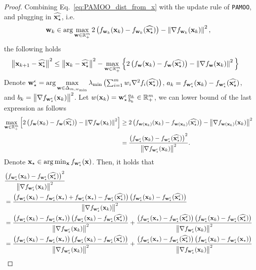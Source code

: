 \begin{proof}
Combining Eq.~\eqref{eq:PAMOO_dist_from_x} with the update rule of \texttt{PAMOO}, and plugging in $\widehat{{{\mathbf{x}}_\star^\epsilon}}$, i.e. 
$$
{\mathbf{w}}_k\in \arg\max_{{\mathbf{w}}\in \mathbb{R}^m_+} 2\left(f_{{\mathbf{w}}_k}({\mathbf{x}}_k)- f_{{\mathbf{w}}_k} (\widehat{{{\mathbf{x}}_\star^\epsilon}})\right) - \left\Vert\nabla f_{{\mathbf{w}}_k}({\mathbf{x}}_k)\right\Vert^2,
$$
the following holds
\begin{align}
    \left\Vert{\mathbf{x}}_{k+1}-\widehat{{{\mathbf{x}}_\star^\epsilon}}\right\Vert^2 &\leq \left\Vert{\mathbf{x}}_k-\widehat{{{\mathbf{x}}_\star^\epsilon}}\right\Vert^2 -  \max_{{\mathbf{w}} \in \mathbb{R}_+^m} \Big{\{} 2\left(f_{{\mathbf{w}}}({\mathbf{x}}_k)- f_{{\mathbf{w}}} (\widehat{{{\mathbf{x}}_\star^\epsilon}})\right) - \left\Vert\nabla f_{{\mathbf{w}}}({\mathbf{x}}_k)\right\Vert^2 \Big{\}} \label{eq:epsilon_PAMOO_dist_from_opt}
\end{align}
Denote ${{\mathbf{w}}_\star^\epsilon} = \arg\max\limits_{{\mathbf{w}}\in \Delta_{m,{w_{\min}}}} \lambda_{\min}\left(\sum_{i=1}^m w_i \nabla^2 f_i(\widehat{{{\mathbf{x}}_\star^\epsilon}})\right)$, $a_k = f_{{{\mathbf{w}}_\star^\epsilon}}({\mathbf{x}}_k)- f_{{{\mathbf{w}}_\star^\epsilon}} (\widehat{{{\mathbf{x}}_\star^\epsilon}})$, and $b_k = \left\Vert\nabla f_{{{\mathbf{w}}_\star^\epsilon}}({\mathbf{x}}_k)\right\Vert^2$. Let $w({\mathbf{x}}_k) = {{\mathbf{w}}_\star^\epsilon} \frac{a_k}{b_k} \in \mathbb{R}^m_+$, we can lower bound of the last expression as follows
\begin{align*}
    \max_{{\mathbf{w}}\in \mathbb{R}_+^m} \left[ 2\left(f_{{\mathbf{w}}}({\mathbf{x}}_k)- f_{{\mathbf{w}}} (\widehat{{{\mathbf{x}}_\star^\epsilon}})\right) - \left\Vert\nabla f_{{\mathbf{w}}}({\mathbf{x}}_k)\right\Vert^2 \right] & \geq 2\left(f_{{\mathbf{w}}({\mathbf{x}}_k)}({\mathbf{x}}_k)- f_{{\mathbf{w}}({\mathbf{x}}_k)} (\widehat{{{\mathbf{x}}_\star^\epsilon}})\right)  -\left\Vert\nabla f_{{\mathbf{w}}({\mathbf{x}}_k)}({\mathbf{x}}_k)\right\Vert^2 \\
    & =   \frac{\left(f_{{{\mathbf{w}}_\star^\epsilon}}({\mathbf{x}}_k)- f_{{{\mathbf{w}}_\star^\epsilon}} (\widehat{{{\mathbf{x}}_\star^\epsilon}})\right)^2}{\left\Vert\nabla f_{{{\mathbf{w}}_\star^\epsilon}}({\mathbf{x}}_k)\right\Vert^2}.
\end{align*}
Denote ${\mathbf{x}}_\star \in \arg\min_{\mathbf{x}} f_{{{\mathbf{w}}_\star^\epsilon}}({\mathbf{x}}) $. Then, it holds that 
\begin{align*}
    &\frac{\brac{f_{\wse}(\x_k)- f_{\wse} (\widehat{\xse})}^2}{\enorm{\nabla f_{\wse}(\x_k)}^2} \\
    & =   \frac{\brac{f_{\wse}(\x_k)- f_{\wse} (\x_\star) + f_{\wse}(\x_\star)- f_{\wse} (\widehat{\xse})}\brac{f_{\wse}(\x_k)- f_{\wse} (\widehat{\xse})}}{\enorm{\nabla f_{\wse}(\x_k)}^2}\\
    & =   \frac{\brac{f_{\wse}(\x_k)- f_{\wse} (\x_\star)}\brac{f_{\wse}(\x_k)- f_{\wse} (\widehat{\xse})}}{\enorm{\nabla f_{\wse}(\x_k)}^2} + \frac{\brac{ f_{\wse}(\x_\star)- f_{\wse} (\widehat{\xse})}\brac{f_{\wse}(\x_k)- f_{\wse} (\widehat{\xse})}}{\enorm{\nabla f_{\wse}(\x_k)}^2}\\
    & =   \frac{\brac{f_{\wse}(\x_k)- f_{\wse} (\x_\star)}\brac{f_{\wse}(\x_k)- f_{\wse} (\widehat{\xse})}}{\enorm{\nabla f_{\wse}(\x_k)}^2} + \frac{\brac{ f_{\wse}(\x_\star)- f_{\wse} (\widehat{\xse})}\brac{f_{\wse}(\x_k)- f_{\wse} (\x_\star)}}{\enorm{\nabla f_{\wse}(\x_k)}^2} \\

\end{align*}
\end{proof}
